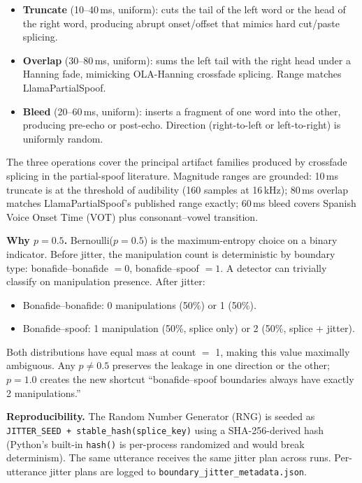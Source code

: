 \documentclass[conference]{IEEEtran}
\begin{document}
\begin{itemize}
    \item \textbf{Truncate} (10--40\,ms, uniform): cuts the tail of the left word or the head of the right word, producing abrupt onset/offset that mimics hard cut/paste splicing.
    \item \textbf{Overlap} (30--80\,ms, uniform): sums the left tail with the right head under a Hanning fade, mimicking OLA-Hanning crossfade splicing. Range matches LlamaPartialSpoof.
    \item \textbf{Bleed} (20--60\,ms, uniform): inserts a fragment of one word into the other, producing pre-echo or post-echo. Direction (right-to-left or left-to-right) is uniformly random.
\end{itemize}

The three operations cover the principal artifact families produced by crossfade splicing in the partial-spoof literature. Magnitude ranges are grounded: 10\,ms truncate is at the threshold of audibility (160 samples at 16\,kHz); 80\,ms overlap matches LlamaPartialSpoof's published range exactly; 60\,ms bleed covers Spanish Voice Onset Time (VOT) plus consonant--vowel transition.

\textbf{Why $p=0.5$.} Bernoulli($p{=}0.5$) is the maximum-entropy choice on a binary indicator. Before jitter, the manipulation count is deterministic by boundary type: bonafide--bonafide $= 0$, bonafide--spoof $= 1$. A detector can trivially classify on manipulation presence. After jitter:

\begin{itemize}
    \item Bonafide--bonafide: 0 manipulations (50\%) or 1 (50\%).
    \item Bonafide--spoof: 1 manipulation (50\%, splice only) or 2 (50\%, splice + jitter).
\end{itemize}

Both distributions have equal mass at count $=$ 1, making this value maximally ambiguous. Any $p \neq 0.5$ preserves the leakage in one direction or the other; $p=1.0$ creates the new shortcut ``bonafide--spoof boundaries always have exactly 2 manipulations.''

\textbf{Reproducibility.} The Random Number Generator (RNG) is seeded as \texttt{JITTER\_SEED + stable\_hash(splice\_key)} using a SHA-256-derived hash (Python's built-in \texttt{hash()} is per-process randomized and would break determinism). The same utterance receives the same jitter plan across runs. Per-utterance jitter plans are logged to \texttt{boundary\_jitter\_metadata.json}.
\end{document}
